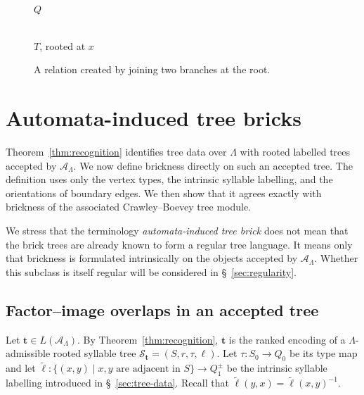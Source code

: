 \documentclass[11pt,a4paper]{amsart}
\theoremstyle{definition}
\theoremstyle{plain}
\theoremstyle{remark}
\numberwithin{equation}{section}
\begin{document}
\begin{figure}[H]
\centering
\begin{minipage}{0.43\textwidth}
\centering
{}
\\
$Q$
\end{minipage}
\hfill
\begin{minipage}{0.43\textwidth}
\centering
{}
\\
$T$, rooted at $x$
\end{minipage}
\caption{A relation created by joining two branches at the root.}
\label{fig:relation-profile}
\end{figure}

\section{Automata-induced tree bricks}
\label{sec:bricks}

Theorem~\ref{thm:recognition} identifies tree data over $\Lambda$ with rooted labelled trees accepted by $\mathcal A_\Lambda$. We now define brickness directly on such an accepted tree. The definition uses only the vertex types, the intrinsic syllable labelling, and the orientations of boundary edges. We then show that it agrees exactly with brickness of the associated Crawley--Boevey tree module.

We stress that the terminology \emph{automata-induced tree brick} does not mean that the brick trees are already known to form a regular tree language. It means only that brickness is formulated intrinsically on the objects accepted by $\mathcal A_\Lambda$. Whether this subclass is itself regular will be considered in \S~\ref{sec:regularity}.

\subsection{Factor--image overlaps in an accepted tree}

Let $\mathbf t\in L(\mathcal A_\Lambda)$. By Theorem~\ref{thm:recognition}, $\mathbf t$ is the ranked encoding of a $\Lambda$-admissible rooted syllable tree
$
\mathcal S_{\mathbf t}=(S,r,\tau,\ell).
$
Let $\tau:S_0\to Q_0$ be its type map and let
$
\widetilde{\ell}:\{(x,y)\mid x,y\text{ are adjacent in }S\}\longrightarrow Q_1^{\pm}
$
be the intrinsic syllable labelling introduced in \S~\ref{sec:tree-data}. Recall that $\widetilde{\ell}(y,x)=\widetilde{\ell}(x,y)^{-1}$.
\end{document}
